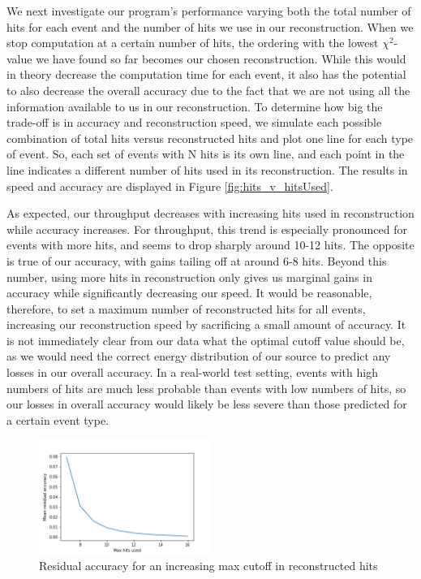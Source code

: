 We next investigate our program's performance varying both the total number of hits for each event and the number of hits we use in our reconstruction. When we stop computation at a certain number of hits, the ordering with the lowest $\chi^2$-value we have found so far becomes our chosen reconstruction. While this would in theory decrease the computation time for each event, it also has the potential to also decrease the overall accuracy due to the fact that we are not using all the information available to us in our reconstruction. To determine how big the trade-off is in accuracy and reconstruction speed, we simulate each possible combination of total hits versus reconstructed hits and plot one line for each type of event. So, each set of events with N hits is its own line, and each point in the line indicates a different number of hits used in its reconstruction. The results in speed and accuracy are displayed in Figure \ref{fig:hits_v_hitsUsed}.

As expected, our throughput decreases with increasing hits used in reconstruction while accuracy increases. For throughput, this trend is especially pronounced for events with more hits, and seems to drop sharply around 10-12 hits. The opposite is true of our accuracy, with gains tailing off at around 6-8 hits. Beyond this number, using more hits in reconstruction only gives us marginal gains in accuracy while significantly decreasing our speed. It would be reasonable, therefore, to set a maximum number of reconstructed hits for all events, increasing our reconstruction speed by sacrificing a small amount of accuracy. It is not immediately clear from our data what the optimal cutoff value should be, as we would need the correct energy distribution of our source to predict any losses in our overall accuracy. In a real-world test setting, events with high numbers of hits are much less probable than events with low numbers of hits, so our losses in overall accuracy would likely be less severe than those predicted for a certain event type.

\begin{figure}
    \centering
    \includegraphics[width=0.5\textwidth]{graphs/mean_resid_acc.png}
    \caption{Residual accuracy for an increasing max cutoff in reconstructed hits}
    \label{fig:hits_v_hitsUsed_resids}
\end{figure}

